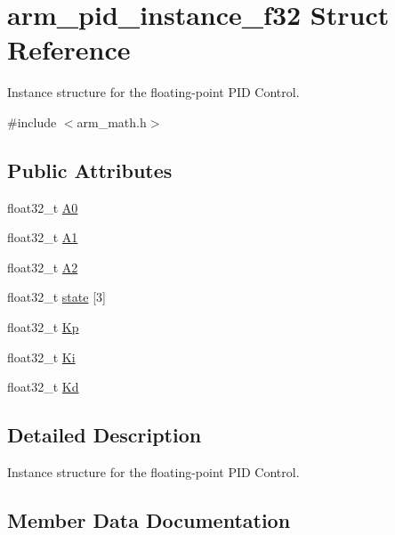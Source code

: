 \hypertarget{structarm__pid__instance__f32}{}\section{arm\+\_\+pid\+\_\+instance\+\_\+f32 Struct Reference}
\label{structarm__pid__instance__f32}


Instance structure for the floating-\/point P\+ID Control.  




{\ttfamily \#include $<$arm\+\_\+math.\+h$>$}

\subsection*{Public Attributes}
\begin{DoxyCompactItemize}
\item 
float32\+\_\+t \hyperlink{structarm__pid__instance__f32_ad7b0bed64915d0a25a3409fa2dc45556}{A0}
\item 
float32\+\_\+t \hyperlink{structarm__pid__instance__f32_a7def89571c50f7137a213326a396e560}{A1}
\item 
float32\+\_\+t \hyperlink{structarm__pid__instance__f32_a155acf642ba2f521869f19d694cd7fa0}{A2}
\item 
float32\+\_\+t \hyperlink{structarm__pid__instance__f32_afd394e1e52fb1d526aa472c83b8f2464}{state} \mbox{[}3\mbox{]}
\item 
float32\+\_\+t \hyperlink{structarm__pid__instance__f32_aa9b9aa9e413c6cec376a9dddc9f01ebe}{Kp}
\item 
float32\+\_\+t \hyperlink{structarm__pid__instance__f32_ac0feffde05fe391eeab3bf78e953830a}{Ki}
\item 
float32\+\_\+t \hyperlink{structarm__pid__instance__f32_ad5b68fbf84d16188ae4747ff91f6f088}{Kd}
\end{DoxyCompactItemize}


\subsection{Detailed Description}
Instance structure for the floating-\/point P\+ID Control. 

\subsection{Member Data Documentation}
